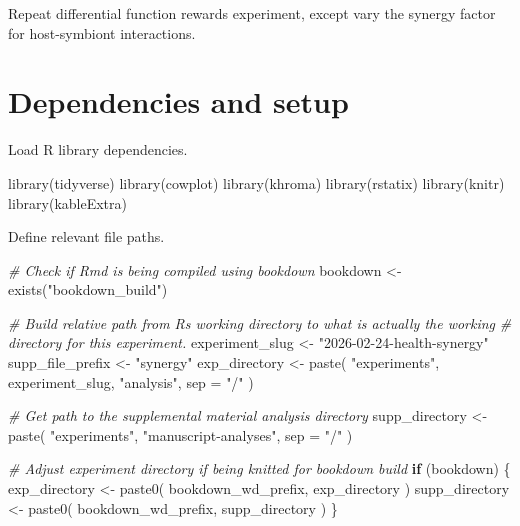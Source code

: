\documentclass[
]{book}
\newenvironment{Shaded}{\begin{snugshade}}{\end{snugshade}}
\newcommand{\AttributeTok}[1]{\textcolor[rgb]{0.77,0.63,0.00}{#1}}
\newcommand{\CommentTok}[1]{\textcolor[rgb]{0.56,0.35,0.01}{\textit{#1}}}
\newcommand{\ControlFlowTok}[1]{\textcolor[rgb]{0.13,0.29,0.53}{\textbf{#1}}}
\newcommand{\FunctionTok}[1]{\textcolor[rgb]{0.00,0.00,0.00}{#1}}
\newcommand{\NormalTok}[1]{#1}
\newcommand{\OtherTok}[1]{\textcolor[rgb]{0.56,0.35,0.01}{#1}}
\newcommand{\StringTok}[1]{\textcolor[rgb]{0.31,0.60,0.02}{#1}}
\begin{document}
Repeat differential function rewards experiment,
except vary the synergy factor for host-symbiont interactions.

\hypertarget{dependencies-and-setup-4}{%
\section{Dependencies and setup}\label{dependencies-and-setup-4}}

Load R library dependencies.

\begin{Shaded}
\begin{Highlighting}[]
\FunctionTok{library}\NormalTok{(tidyverse)}
\FunctionTok{library}\NormalTok{(cowplot)}
\FunctionTok{library}\NormalTok{(khroma)}
\FunctionTok{library}\NormalTok{(rstatix)}
\FunctionTok{library}\NormalTok{(knitr)}
\FunctionTok{library}\NormalTok{(kableExtra)}
\end{Highlighting}
\end{Shaded}

Define relevant file paths.

\begin{Shaded}
\begin{Highlighting}[]
\CommentTok{\# Check if Rmd is being compiled using bookdown}
\NormalTok{bookdown }\OtherTok{\textless{}{-}} \FunctionTok{exists}\NormalTok{(}\StringTok{"bookdown\_build"}\NormalTok{)}

\CommentTok{\# Build relative path from R\textquotesingle{}s working directory to what is actually the working}
\CommentTok{\# directory for this experiment.}
\NormalTok{experiment\_slug }\OtherTok{\textless{}{-}} \StringTok{"2026{-}02{-}24{-}health{-}synergy"}
\NormalTok{supp\_file\_prefix }\OtherTok{\textless{}{-}} \StringTok{"synergy"}
\NormalTok{exp\_directory }\OtherTok{\textless{}{-}} \FunctionTok{paste}\NormalTok{(}
  \StringTok{"experiments"}\NormalTok{,}
\NormalTok{  experiment\_slug,}
  \StringTok{"analysis"}\NormalTok{,}
  \AttributeTok{sep =} \StringTok{"/"}
\NormalTok{)}

\CommentTok{\# Get path to the supplemental material analysis directory}
\NormalTok{supp\_directory }\OtherTok{\textless{}{-}} \FunctionTok{paste}\NormalTok{(}
  \StringTok{"experiments"}\NormalTok{,}
  \StringTok{"manuscript{-}analyses"}\NormalTok{,}
  \AttributeTok{sep =} \StringTok{"/"}
\NormalTok{)}

\CommentTok{\# Adjust experiment directory if being knitted for bookdown build}
\ControlFlowTok{if}\NormalTok{ (bookdown) \{}
\NormalTok{  exp\_directory }\OtherTok{\textless{}{-}} \FunctionTok{paste0}\NormalTok{(}
\NormalTok{    bookdown\_wd\_prefix,}
\NormalTok{    exp\_directory}
\NormalTok{  )}
\NormalTok{  supp\_directory }\OtherTok{\textless{}{-}} \FunctionTok{paste0}\NormalTok{(}
\NormalTok{    bookdown\_wd\_prefix,}
\NormalTok{    supp\_directory}
\NormalTok{  )}
\NormalTok{\}}
\end{Highlighting}
\end{Shaded}
\end{document}
